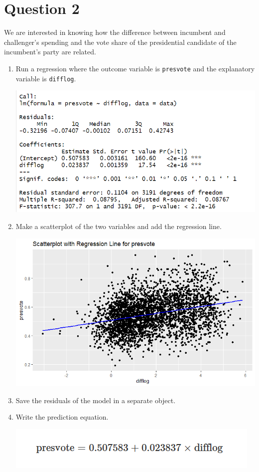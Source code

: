 \documentclass[12pt,letterpaper]{article}
\begin{document}
\newpage

\section*{Question 2}
\noindent We are interested in knowing how the difference between incumbent and challenger's spending and the vote share of the presidential candidate of the incumbent's party are related.	\vspace{.25cm}
	\begin{enumerate}
		\item Run a regression where the outcome variable is \texttt{presvote} and the explanatory variable is \texttt{difflog}.
		 
		\includegraphics[width=0.8\linewidth]{Q5}
		\item Make a scatterplot of the two variables and add the regression line. 
    	 
    	\includegraphics[width=0.9\linewidth]{Q6}
		\item Save the residuals of the model in a separate object.
		 
		\item Write the prediction equation.
		 
		\includegraphics[width=0.8\linewidth]{Q8}
	\end{enumerate}
	
\end{document}
